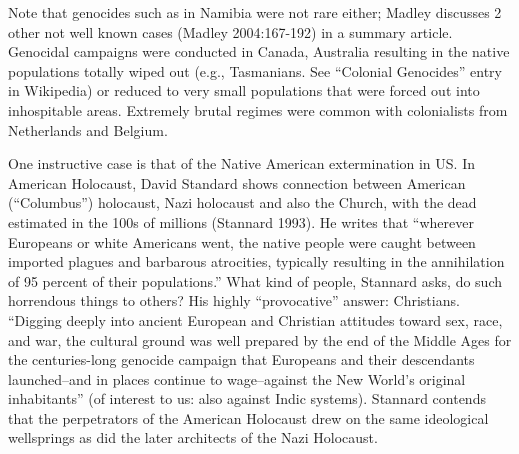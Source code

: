 Note that genocides such as in Namibia were not rare either; Madley discusses 2 other not well known cases (Madley 2004:167-192) in a summary article. Genocidal campaigns were conducted in Canada, Australia resulting in the native populations totally wiped out (e.g., Tasmanians. See “Colonial Genocides” entry in Wikipedia) or reduced to very small populations that were forced out into inhospitable areas.  Extremely brutal regimes were common with colonialists from Netherlands and Belgium.

One instructive case is that of the Native American extermination in US.  In American Holocaust, David Standard shows connection between American (“Columbus”) holocaust, Nazi holocaust and also the Church, with the dead estimated in the 100s of millions (Stannard 1993). He writes that “wherever Europeans or white Americans went, the native people were caught between imported plagues and barbarous atrocities, typically resulting in the annihilation of 95 percent of their populations.” What kind of people, Stannard asks, do such horrendous things to others? His highly “provocative” answer: Christians. “Digging deeply into ancient European and Christian attitudes toward sex, race, and war, the cultural ground was well prepared by the end of the Middle Ages for the centuries-long genocide campaign that Europeans and their descendants launched--and in places continue to wage--against the New World's original inhabitants” (of interest to us: also against Indic systems). Stannard contends that the perpetrators of the American Holocaust drew on the same ideological wellsprings as did the later architects of the Nazi Holocaust.

